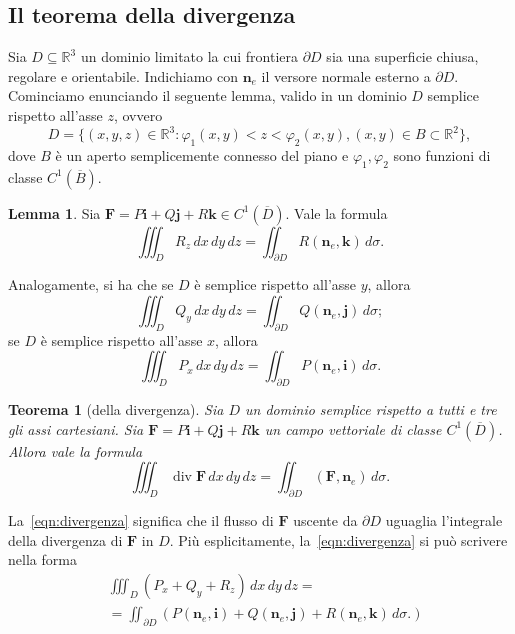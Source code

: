 \documentclass[a4paper]{book}
\DeclareMathOperator{\divg}{div}
\numberwithin{equation}{section}
\renewcommand{\phi}{\varphi}
\theoremstyle{plain}
\newtheorem{teor}{Teorema}[section]
\theoremstyle{definition}
\newtheorem{lem}{Lemma}[section]
\theoremstyle{remark}
\renewcommand{\vec}{\boldsymbol}
\theoremstyle{example}
\begin{document}
	\subsection{Il teorema della divergenza}
	Sia $D \subseteq \mathbb{R}^3$ un dominio limitato la cui frontiera $\partial D$ sia una superficie chiusa, regolare e orientabile. Indichiamo con $\vec{n}_e$ il versore normale esterno a $\partial D$.
	Cominciamo enunciando il seguente lemma, valido in un dominio $D$ semplice rispetto all'asse $z$, ovvero
	\begin{equation*}
		D = \{(x, y, z) \in \mathbb{R}^3 \colon \phi_1(x, y) < z < \phi_2(x, y), (x, y) \in B \subset \mathbb{R}^2\},
	\end{equation*}
	dove $B$ è un aperto semplicemente connesso del piano e $\phi_1, \phi_2$ sono funzioni di classe $C^1(\overline{B})$.

	\begin{lem}
		Sia $\vec{F} = P\vec{i} + Q\vec{j} + R\vec{k} \in C^1(\overline{D})$. Vale la formula
		\begin{equation}
			\iiint_D R_z \,dx\,dy\,dz = \iint_{\partial D}R(\vec{n}_e, \vec{k})\,d\sigma.
		\end{equation}
	\end{lem}

	Analogamente, si ha che se $D$ è semplice rispetto all'asse $y$, allora
	\begin{equation}
		\iiint_D Q_y \,dx \,dy\,dz = \iint_{\partial D}Q(\vec{n}_e, \vec{j}) \, d\sigma;
	\end{equation}
	se $D$ è semplice rispetto all'asse $x$, allora
	\begin{equation}
		\iiint_D P_x\,dx\,dy\,dz = \iint_{\partial D} P (\vec{n}_e, \vec{i})\, d\sigma.
	\end{equation}

	\begin{teor}[della divergenza]
		\label{divergenza}
		Sia $D$ un dominio semplice rispetto a tutti e tre gli assi cartesiani. Sia $\vec{F} = P\vec{i} + Q\vec{j} + R\vec{k}$ un campo vettoriale di classe $C^1(\overline{D})$. Allora vale la formula
		\begin{equation}
			\label{eqn:divergenza}
			\iiint_D \divg \vec{F} \, dx \, dy \, dz = \iint_{\partial D} (\vec{F}, \vec{n}_e)\, d \sigma.
		\end{equation}
	\end{teor}

	La~\eqref{eqn:divergenza} significa che il flusso di $\vec{F}$ uscente da $\partial D$ uguaglia l'integrale della divergenza di $\vec{F}$ in $D$. Più esplicitamente, la~\eqref{eqn:divergenza} si può scrivere nella forma
	\begin{equation*}
		\begin{split}
			&\iiint_D(P_x + Q_y + R_z)\,dx\,dy\,dz = \\
			&= \iint_{\partial D}(P(\vec{n}_e, \vec{i}) + Q(\vec{n}_e, \vec{j}) + R(\vec{n}_e, \vec{k})\,d\sigma.)
		\end{split}
	\end{equation*}
\end{document}
